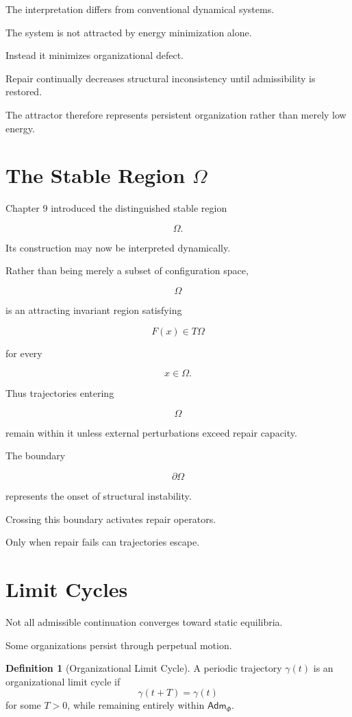\documentclass[11pt,oneside]{book}
\numberwithin{equation}{chapter}
\theoremstyle{definition}
\newtheorem{definition}{Definition}[chapter]
\theoremstyle{plain}
\newcommand{\Adm}{\mathsf{Adm}}
\begin{document}
The interpretation differs from conventional dynamical systems.

The system is not attracted by energy minimization alone.

Instead it minimizes organizational defect.

Repair continually decreases structural inconsistency until admissibility is
restored.

The attractor therefore represents persistent organization rather than
merely low energy.

\section{The Stable Region \texorpdfstring{$\Omega$}{Omega}}

Chapter 9 introduced the distinguished stable region

\[
\Omega.
\]

Its construction may now be interpreted dynamically.

Rather than being merely a subset of configuration space,

\[
\Omega
\]

is an attracting invariant region satisfying

\[
F(x)
\in
T\Omega
\]

for every

\[
x
\in
\Omega.
\]

Thus trajectories entering

\[
\Omega
\]

remain within it unless external perturbations exceed repair capacity.

The boundary

\[
\partial\Omega
\]

represents the onset of structural instability.

Crossing this boundary activates repair operators.

Only when repair fails can trajectories escape.

\section{Limit Cycles}

Not all admissible continuation converges toward static equilibria.

Some organizations persist through perpetual motion.

\begin{definition}[Organizational Limit Cycle]
A periodic trajectory \(\gamma(t)\) is an organizational limit cycle if
\[
\gamma(t+T)
=
\gamma(t)
\]
for some \(T>0\), while remaining entirely within \(\Adm_\Phi\).
\end{definition}
\end{document}
